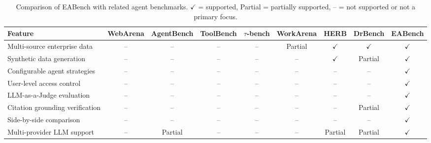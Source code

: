 \documentclass[10pt,twocolumn]{article}
\begin{document}
\begin{table}[t]
\centering
\caption{Comparison of EABench with related agent benchmarks.
$\checkmark$ = supported, Partial = partially supported, -- = not supported or
not a primary focus.}
\label{tab:comparison}
\scriptsize
\setlength{\tabcolsep}{3pt}
\begin{tabular}{lcccccccc}
\toprule
\textbf{Feature} & \textbf{WebArena} & \textbf{AgentBench} & \textbf{ToolBench} & \textbf{$\tau$-bench} & \textbf{WorkArena} & \textbf{HERB} & \textbf{DrBench} & \textbf{EABench} \\
\midrule
 Multi-source enterprise data          & --            & --             & --             & --              & Partial        & $\checkmark$ & $\checkmark$ & $\checkmark$ \\
 Synthetic data generation             & --            & --             & --             & --              & --             & $\checkmark$ & Partial      & $\checkmark$ \\
 Configurable agent strategies         & --            & --             & --             & --              & --             & --            & --           & $\checkmark$ \\
 User-level access control             & --            & --             & --             & --              & --             & --            & --           & $\checkmark$ \\
 LLM-as-a-Judge evaluation             & --            & --             & --             & --              & --             & --            & --           & $\checkmark$ \\
 Citation grounding verification       & --            & --             & --             & --              & --             & --            & Partial      & $\checkmark$ \\
 Side-by-side comparison               & --            & --             & --             & --              & --             & --            & --           & $\checkmark$ \\
 Multi-provider LLM support            & --            & Partial        & --             & --              & --             & Partial       & Partial      & $\checkmark$ \\
\bottomrule
\end{tabular}
\end{table}

\end{document}
